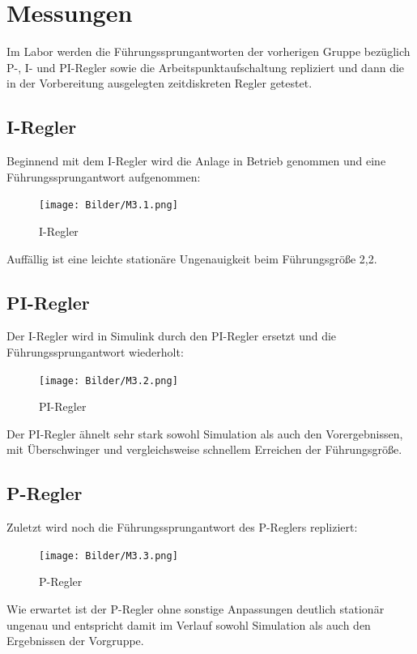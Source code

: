 \documentclass{report}
\begin{document}

\section{Messungen}
\textmd{Im Labor werden die Führungssprungantworten der vorherigen Gruppe bezüglich P-, I- und PI-Regler sowie die Arbeitspunktaufschaltung repliziert und dann die in der Vorbereitung ausgelegten zeitdiskreten Regler getestet.}


\subsection{I-Regler}
\textmd{Beginnend mit dem I-Regler wird die Anlage in Betrieb genommen und eine Führungssprungantwort aufgenommen:}
        \begin{figure}[H]
            \centering
            \texttt{[image: Bilder/M3.1.png]}
            \caption{I-Regler}
            \label{fig:M3.1.png}
        \end{figure}
\textmd{Auffällig ist eine leichte stationäre Ungenauigkeit beim Führungsgröße 2,2.}


\subsection{PI-Regler}
\textmd{Der I-Regler wird in Simulink durch den PI-Regler ersetzt und die Führungssprungantwort wiederholt:}
        \begin{figure}[H]
            \centering
            \texttt{[image: Bilder/M3.2.png]}
            \caption{PI-Regler}
            \label{fig:M3.2.png}
        \end{figure}
\textmd{Der PI-Regler ähnelt sehr stark sowohl Simulation als auch den Vorergebnissen, mit Überschwinger und vergleichsweise schnellem Erreichen der Führungsgröße.}

\subsection{P-Regler}
\textmd{Zuletzt wird noch die Führungssprungantwort des P-Reglers repliziert:}
        \begin{figure}[H]
            \centering
            \texttt{[image: Bilder/M3.3.png]}
            \caption{P-Regler}
            \label{fig:M3.3.png}
        \end{figure}
\textmd{Wie erwartet ist der P-Regler ohne sonstige Anpassungen deutlich stationär ungenau und entspricht damit im Verlauf sowohl Simulation als auch den Ergebnissen der Vorgruppe.}
\end{document}
